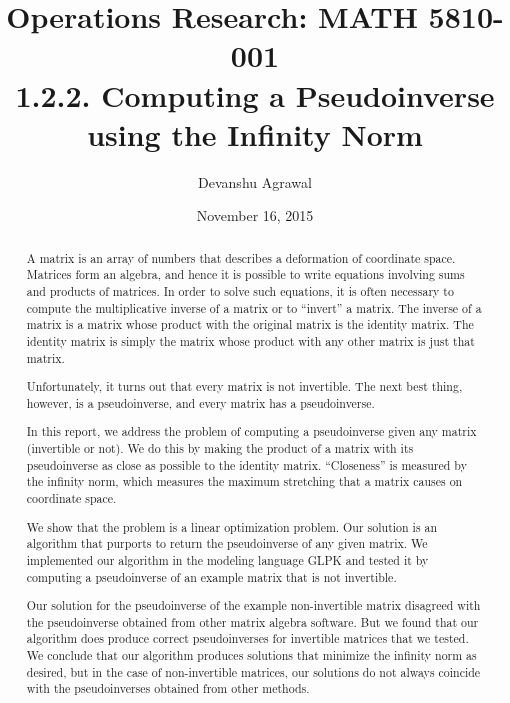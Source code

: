 \documentclass[12pt, a4paper, notitlepage]{report}
\title{Operations Research: MATH 5810-001 \\
       1.2.2. Computing a Pseudoinverse using the Infinity Norm }  %
\author{Devanshu Agrawal}  %
\date{November 16, 2015}  %
\begin{document}
\maketitle

\begin{abstract}
A matrix is an array of numbers that describes a deformation of coordinate space. Matrices form an algebra, and hence it is possible to write equations involving sums and products of matrices. In order to solve such equations, it is often necessary to compute the multiplicative inverse of a matrix or to ``invert'' a matrix. The inverse of a matrix is a matrix whose product with the original matrix is the identity matrix. The identity matrix is simply the matrix whose product with any other matrix is just that matrix.

Unfortunately, it turns out that every matrix is not invertible. The next best thing, however, is a pseudoinverse, and every matrix has a pseudoinverse.

In this report, we address the problem of computing a pseudoinverse given any matrix (invertible or not). We do this by making the product of a matrix with its pseudoinverse as close as possible to the identity matrix. ``Closeness'' is measured by the infinity norm, which measures the maximum stretching that a matrix causes on coordinate space.

We show that the problem is a linear optimization problem. Our solution is an algorithm that purports to return the pseudoinverse of any given matrix. We implemented our algorithm in the modeling language GLPK and tested it by computing a pseudoinverse of an example matrix that is not invertible.

Our solution for the pseudoinverse of the example non-invertible matrix disagreed with the pseudoinverse obtained from other matrix algebra software. But we found that our algorithm does produce correct pseudoinverses for invertible matrices that we tested. We conclude that our algorithm produces solutions that minimize the infinity norm as desired, but in the case of non-invertible matrices, our solutions do not always coincide with the pseudoinverses obtained from other methods.
\end{abstract}

\newpage %

\end{document}
